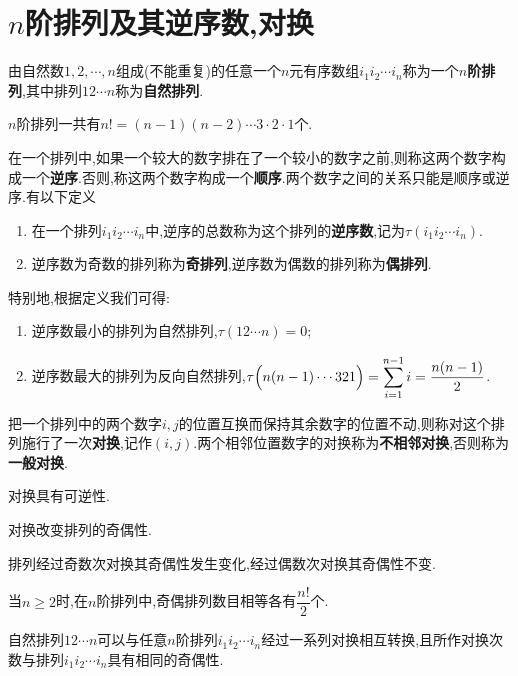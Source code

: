 \documentclass[9pt,a4paper]{book}
\begin{document}
\section{$ n $阶排列及其逆序数,对换}
\begin{defination}[排列的定义]
	由自然数$ 1,2,\cdots,n $组成(不能重复)的任意一个$ n $元有序数组$ i_1i_2\cdots i_n $称为一个\textbf{$ n $阶排列},其中排列$ 12\cdots n  $称为\textbf{自然排列}.
\end{defination}
\begin{theorem}
	$ n $阶排列一共有$ n!=(n-1)(n-2)\cdots 3\cdot 2\cdot 1  $个.
\end{theorem}
\begin{defination}
	在一个排列中,如果一个较大的数字排在了一个较小的数字之前,则称这两个数字构成一个\textbf{逆序}.否则,称这两个数字构成一个\textbf{顺序}.两个数字之间的关系只能是顺序或逆序.有以下定义
	\begin{enumerate}
		\item 在一个排列$ i_1i_2\cdots i_n $中,逆序的总数称为这个排列的\textbf{逆序数},记为$ \tau(i_1i_2\cdots i_n) $.
		\item 逆序数为奇数的排列称为\textbf{奇排列},逆序数为偶数的排列称为\textbf{偶排列}.
	\end{enumerate}
特别地,根据定义我们可得:\begin{enumerate}
	\item 逆序数最小的排列为自然排列,$ \tau(12\cdots n)=0 $;
	\item 逆序数最大的排列为反向自然排列,$ \displaystyle \tau\Bigl( n(n-1)\cdots321\Bigr) =\sum_{i=1}^{n-1}i=\frac{n(n-1)}{2} $.
\end{enumerate}
\end{defination}
\begin{defination}[对换的定义]
	把一个排列中的两个数字$ i,j $的位置互换而保持其余数字的位置不动,则称对这个排列施行了一次\textbf{对换},记作$ (i,j) $.两个相邻位置数字的对换称为\textbf{不相邻对换},否则称为\textbf{一般对换}.
\end{defination}
\begin{theorem}
	对换具有可逆性.
\end{theorem}
\begin{theorem}
	对换改变排列的奇偶性.
\end{theorem}
\begin{inference}
	排列经过奇数次对换其奇偶性发生变化,经过偶数次对换其奇偶性不变.
\end{inference}
\begin{inference}
	当$ n\geqslant 2 $时,在$ n $阶排列中,奇偶排列数目相等各有$ \dfrac{n!}{2} $个.
\end{inference}
\begin{theorem}
	自然排列$ 12\cdots n $可以与任意$ n $阶排列$ i_1i_2\cdots i_n $经过一系列对换相互转换,且所作对换次数与排列$ i_1i_2\cdots i_n $具有相同的奇偶性.
\end{theorem}
\end{document}
